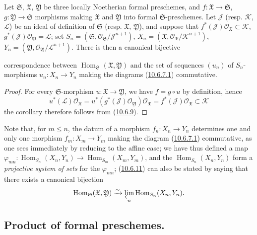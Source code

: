 \begin{corollary}[10.6.11]
\label{I.10.6.11}
Let $\mathfrak{S}$, $\mathfrak{X}$, $\mathfrak{Y}$ be three locally
Noetherian formal preschemes, and
$f:\mathfrak{X}\to\mathfrak{S}$,
$g:\mathfrak{Y}\to\mathfrak{S}$ morphisms making
$\mathfrak{X}$ and $\mathfrak{Y}$ into formal $\mathfrak{S}$-preschemes.
Let $\mathscr{J}$ (resp. $\mathscr{K}$, $\mathscr{L}$) be an
ideal of definition of $\mathfrak{S}$ (resp. $\mathfrak{X}$,
$\mathfrak{Y}$), and suppose that
$f^*(\mathscr{J})\mathscr{O}_{\mathfrak{X}}\subset\mathscr{K}$,
$g^*(\mathscr{J})\mathscr{O}_{\mathfrak{Y}}=\mathscr{L}$; set
$S_n=(\mathfrak{S},
\mathscr{O}_{\mathfrak{S}}/\mathscr{J}^{n+1})$,
$X_n=(\mathfrak{X},
\mathscr{O}_{\mathfrak{X}}/\mathscr{K}^{n+1})$,
$Y_n=(\mathfrak{Y},
\mathscr{O}_{\mathfrak{Y}}/\mathscr{L}^{n+1})$. There is then a
canonical bijective


correspondence between
$\operatorname{Hom}_{\mathfrak{S}}(\mathfrak{X},\mathfrak{Y})$ and
the set of sequences $(u_n)$ of $S_n$-morphisms
$u_n:X_n\to Y_n$ making the diagrams
(\hyperref[I.10.6.7.1]{10.6.7.1}) commutative.
\end{corollary}

\begin{proof}
For every $\mathfrak{S}$-morphism
$u:\mathfrak{X}\to\mathfrak{Y}$, we have $f=g\circ u$ by definition, hence
\[
  u^*(\mathscr{L})\mathscr{O}_{\mathfrak{X}}
  =u^*(g^*(\mathscr{J})\mathscr{O}_{\mathfrak{Y}})
    \mathscr{O}_{\mathfrak{X}}
  =f^*(\mathscr{J})\mathscr{O}_{\mathfrak{X}}
  \subset\mathscr{K}
\]
the corollary therefore follows from
(\hyperref[I.10.6.9]{10.6.9}).
\end{proof}

Note that, for $m\leq n$, the datum of a morphism
$f_n:X_n\to Y_n$ determines one and only one morphism
$f_m:X_m\to Y_m$ making the diagram
(\hyperref[I.10.6.7.1]{10.6.7.1}) commutative, as one sees
immediately by reducing to the affine case; we have thus defined a map
$\varphi_{mn}:\operatorname{Hom}_{S_n}(X_n,Y_n)
\to\operatorname{Hom}_{S_m}(X_m,Y_m)$, and the
$\operatorname{Hom}_{S_n}(X_n,Y_n)$ form a
\emph{projective system of sets} for the $\varphi_{mn}$;
(\hyperref[I.10.6.11]{10.6.11}) can also be stated by saying that
there exists a canonical bijection
\[
  \operatorname{Hom}_{\mathfrak{S}}(\mathfrak{X},\mathfrak{Y})
  \xrightarrow{\sim}
  \varprojlim_n\operatorname{Hom}_{S_n}(X_n,Y_n).
\]

\subsection{Product of formal preschemes.}
\label{subsection:I.10.7}

